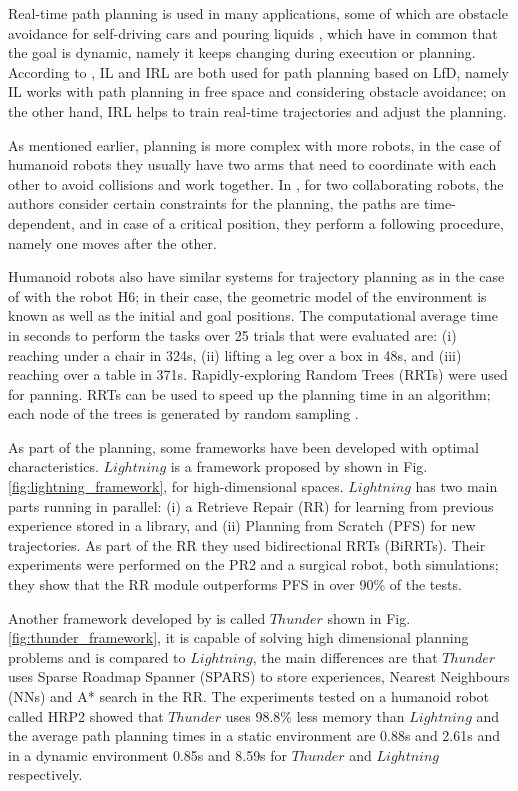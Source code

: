 \documentclass[thesis]{mas_proposal}
\begin{document}
    Real-time path planning is used in many applications, some of which are obstacle avoidance for self-driving cars \cite{Chaocheng2015} and pouring liquids \cite{Yamaguchi2015}, which have in common that the goal is dynamic, namely it keeps changing during execution or planning. According to \cite{Xie2020}, IL and IRL are both used for path planning based on LfD, namely IL works with path planning in free space and considering obstacle avoidance; on the other hand, IRL helps to train real-time trajectories and adjust the planning. 
    
    As mentioned earlier, planning is more complex with more robots, in the case of humanoid robots they usually have two arms that need to coordinate with each other to avoid collisions and work together. In \cite{Pecora2018}, for two collaborating robots, the authors consider certain constraints for the planning, the paths are time-dependent, and in case of a critical position, they perform a following procedure, namely one moves after the other.
    
    Humanoid robots also have similar systems for trajectory planning as in the case of \cite{Kuffner2001} with the robot H6; in their case, the geometric model of the environment is known as well as the initial and goal positions. The computational average time in seconds to perform the tasks over 25 trials that were evaluated are: (i) reaching under a chair in 324s, (ii) lifting a leg over a box in 48s, and (iii) reaching over a table in 371s. Rapidly-exploring Random Trees (RRTs) were used for panning. RRTs can be used to speed up the planning time in an algorithm; each node of the trees is generated by random sampling \cite{Veras2019}.
    
    As part of the planning, some frameworks have been developed with optimal characteristics. $Lightning$ is a framework proposed by \cite{Berenson2012} shown in Fig. \ref{fig:lightning_framework}, for high-dimensional spaces. $Lightning$ has two main parts running in parallel: (i) a Retrieve Repair (RR) for learning from previous experience stored in a library, and (ii) Planning from Scratch (PFS) for new trajectories. As part of the RR they used bidirectional RRTs (BiRRTs). Their experiments were performed on the PR2 and a surgical robot, both simulations; they show that the RR module outperforms PFS in over 90\% of the tests.
    
    Another framework developed by \cite{Coleman2015} is called $Thunder$ shown in Fig. \ref{fig:thunder_framework}, it is capable of solving high dimensional planning problems and is compared to $Lightning$, the main differences are that $Thunder$ uses Sparse Roadmap Spanner (SPARS) to store experiences, Nearest Neighbours (NNs) and A* search in the RR. The experiments tested on a humanoid robot called HRP2 showed that $Thunder$ uses 98.8\% less memory than $Lightning$ and the average path planning times in a static environment are 0.88s and 2.61s and in a dynamic environment 0.85s and 8.59s for $Thunder$ and $Lightning$ respectively.
    
\end{document}
